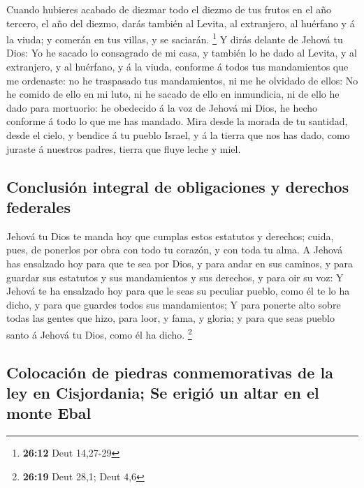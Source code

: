  Cuando hubieres acabado de diezmar todo el diezmo de tus
frutos en el año tercero, el año del diezmo, darás también al Levita, al
extranjero, al huérfano y á la viuda; y comerán en tus villas, y se
saciarán. \footnote{\textbf{26:12} Deut 14,27-29}  Y dirás
delante de Jehová tu Dios: Yo he sacado lo consagrado de mi casa, y
también lo he dado al Levita, y al extranjero, y al huérfano, y á la
viuda, conforme á todos tus mandamientos que me ordenaste: no he
traspasado tus mandamientos, ni me he olvidado de ellos: 
No he comido de ello en mi luto, ni he sacado de ello en inmundicia, ni
de ello he dado para mortuorio: he obedecido á la voz de Jehová mi Dios,
he hecho conforme á todo lo que me has mandado.  Mira desde
la morada de tu santidad, desde el cielo, y bendice á tu pueblo Israel,
y á la tierra que nos has dado, como juraste á nuestros padres, tierra
que fluye leche y miel.

\hypertarget{conclusiuxf3n-integral-de-obligaciones-y-derechos-federales}{%
\subsection{Conclusión integral de obligaciones y derechos
federales}\label{conclusiuxf3n-integral-de-obligaciones-y-derechos-federales}}

 Jehová tu Dios te manda hoy que cumplas estos estatutos y
derechos; cuida, pues, de ponerlos por obra con todo tu corazón, y con
toda tu alma.  A Jehová has ensalzado hoy para que te sea
por Dios, y para andar en sus caminos, y para guardar sus estatutos y
sus mandamientos y sus derechos, y para oir su voz:  Y
Jehová te ha ensalzado hoy para que le seas su peculiar pueblo, como él
te lo ha dicho, y para que guardes todos sus mandamientos; 
Y para ponerte alto sobre todas las gentes que hizo, para loor, y fama,
y gloria; y para que seas pueblo santo á Jehová tu Dios, como él ha
dicho. \footnote{\textbf{26:19} Deut 28,1; Deut 4,6}

\hypertarget{colocaciuxf3n-de-piedras-conmemorativas-de-la-ley-en-cisjordania-se-erigiuxf3-un-altar-en-el-monte-ebal}{%
\subsection{Colocación de piedras conmemorativas de la ley en
Cisjordania; Se erigió un altar en el monte
Ebal}\label{colocaciuxf3n-de-piedras-conmemorativas-de-la-ley-en-cisjordania-se-erigiuxf3-un-altar-en-el-monte-ebal}}

